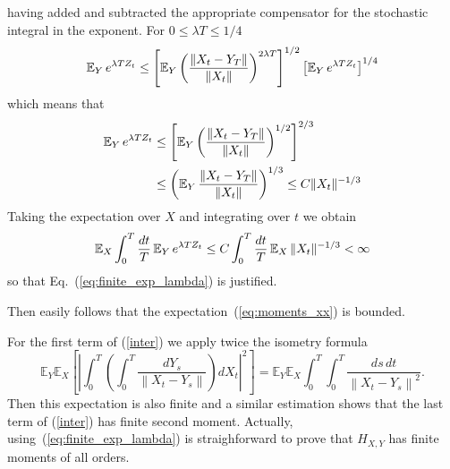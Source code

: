 having added and subtracted the appropriate compensator for the stochastic
integral in the exponent.
For $0 \le \lambda T\le 1/4$
$$
\operatorname{{\mathbb E}}_Y e^{\lambda T Z_t} \le 
\left[ \operatorname{{\mathbb E}}_Y \left(\frac{ \|X_t - Y_T\|}{ \|X_t
 \|}\right)^{2\lambda T}\right]^{1/2} 
\left[\operatorname{{\mathbb E}}_Y e^{ \lambda T Z_t }\right]^{1/4}
$$ 
which means that
\begin{equation*}
\begin{split}
\operatorname{{\mathbb E}}_Y e^{\lambda T Z_t} & \le 
\left[ \operatorname{{\mathbb E}}_Y \left(\frac{ \|X_t - Y_T\|}{ \|X_t
  \|}\right)^{1/2}\right]^{2/3} \\ & \le
 \left( \operatorname{{\mathbb E}}_Y  \frac{ \|X_t - Y_T\|}{ \|X_t
 \|}\right)^{1/3} \le C \| X_t \|^{-1/3}
\end{split}
\end{equation*}
Taking the expectation over $X$ and integrating over $t$ we obtain
$$
\operatorname{{\mathbb E}}_X \int_0^T \frac{dt}{T} \operatorname{{\mathbb E}}_Y e^{\lambda T Z_t} \le 
C \int_0^T \frac{dt}{T}   \operatorname{{\mathbb E}}_X  \| X_t \|^{-1/3} < \infty
$$
so that Eq.~(\ref{eq:finite_exp_lambda}) is justified.

Then easily follows that the expectation~(\ref{eq:moments_xx}) is bounded. 

For the first term of (\ref{inter}) we apply twice the isometry formula 
\begin{equation*}
\mathbb{E}_{Y}\mathbb{E}_{X}\left[ \left| \int_{0}^{T}\left( \int_{0}^{T}%
\frac{dY_{s}}{\left\| X_{t}-Y_{s}\right\| } \right) dX_{t}\right| ^{2}\right]
=\mathbb{E}_{Y}\mathbb{E}_{X}\int_{0}^{T}\int_{0}^{T}
 \frac{  ds \, dt}{\left\| X_{t}-Y_{s}\right\| ^{2}}. 
\end{equation*}
Then this expectation is also finite and a similar estimation shows that the
last term  of (\ref{inter}) has finite second moment.
Actually, using~(\ref{eq:finite_exp_lambda}) is straighforward to prove that
$H_{X,Y}$ has finite moments of all orders. 

